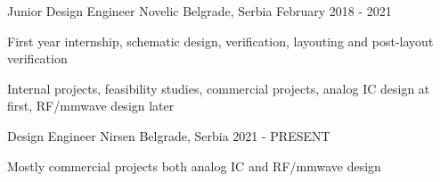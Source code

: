 


\begin{cventries}


\cventry
{Junior Design Engineer} %
{Novelic} %
{Belgrade, Serbia} %
{February 2018 - 2021} %
{ %
\begin{cvitems}
    \item First year internship, schematic design, verification, layouting and post-layout verification
    \item Internal projects, feasibility studies, commercial projects, analog IC design at first, RF/mmwave design later
\end{cvitems}
}


\cventry
{Design Engineer} %
{Nirsen} %
{Belgrade, Serbia} %
{2021 - PRESENT} %
{ %
\begin{cvitems}
    \item Mostly commercial projects both analog IC and RF/mmwave design
\end{cvitems}
}


\end{cventries}